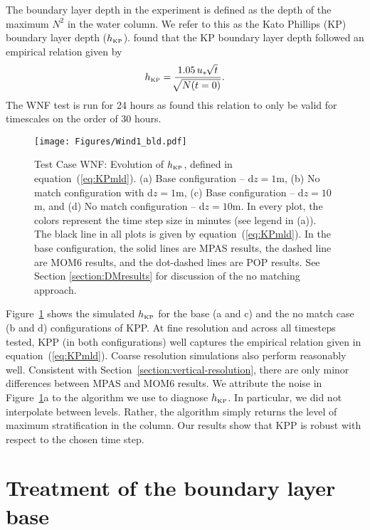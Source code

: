 \documentclass[preprint,12pt,authoryear]{agujournal}
\begin{document}
The boundary layer depth in the experiment is defined as the depth of the maximum $N^2$ in the water column.  We refer to this as the Kato Phillips (KP) boundary layer depth ($h_{\mbox{\tiny KP}}$). \cite{kato1969penetration} found that the KP boundary layer depth followed an empirical relation given by
\begin{equation}
h_{\mbox{\tiny KP}} = \frac{1.05\, u_* \, \sqrt[]{t}}{\sqrt[]{N(t=0)}}.
\label{eq:KPmld}
\end{equation}
The WNF test is run for 24 hours as \citet{kato1969penetration} found this relation to only be valid for timescales on the order of 30 hours.

\begin{figure}[hbtp]
\centering\texttt{[image: Figures/Wind1\_bld.pdf]}
\caption{Test Case WNF: Evolution of $h_{\mbox{\tiny KP}}$, defined in equation~(\ref{eq:KPmld}).  (a) Base configuration -- d$z = 1$m, (b) No match configuration with d$z = 1$m, (c) Base configuration -- d$z = 10$m, and (d) No match configuration -- d$z = 10$m.  In every plot, the colors represent the time step size in minutes (see legend in (a)).  The black line in all plots is given by equation~(\ref{eq:KPmld}).  In the base configuration, the solid lines are MPAS results, the dashed line are MOM6 results, and the dot-dashed lines are POP results.  See Section \ref{section:DMresults} for discussion of the no matching approach.}
\label{wind1_bld}
\end{figure}

Figure~\ref{wind1_bld} shows the simulated $h_{\mbox{\tiny KP}}$ for the base (a and c) and the no match case (b and d) configurations of KPP.  At fine resolution and across all timesteps tested, KPP (in both configurations) well captures the empirical relation given in equation~(\ref{eq:KPmld}). Coarse resolution simulations also perform reasonably well. Consistent with Section~\ref{section:vertical-resolution}, there are only minor differences between MPAS and MOM6 results.  We attribute the noise in Figure~\ref{wind1_bld}a to the algorithm we use to diagnose $h_{\mbox{\tiny KP}}$.  In particular, we did not interpolate between levels. Rather, the algorithm simply returns the level of maximum stratification in the column.  Our results show that KPP is robust with respect to the chosen time step.

\section{Treatment of the boundary layer base}
\label{section:osbl-base-treatment}
\end{document}
